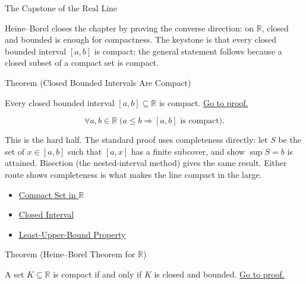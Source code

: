 \label{sec:heine-borel}

\begin{topicbox}{The Capstone of the Real Line}
\begin{exposition}
Heine--Borel closes the chapter by proving the converse direction: on $\mathbb{R}$, closed and bounded is enough for compactness. The keystone is that every closed bounded interval $[a,b]$ is compact; the general statement follows because a closed subset of a compact set is compact.
\end{exposition}
\end{topicbox}
\begin{theorembox}{Theorem (Closed Bounded Intervals Are Compact)}
\begin{theorem}
\label{thm:closed-bounded-interval-compact}
Every closed bounded interval $[a,b]\subseteq\mathbb{R}$ is compact.
\hyperref[prf:closed-bounded-interval-compact]{Go to proof.}
\end{theorem}
\end{theorembox}
\begin{remark*}
\[
\forall a,b\in\mathbb{R}\;\bigl(a\le b \Longrightarrow [a,b]\text{ is compact}\bigr).
\]
\end{remark*}
\begin{remark*}[Interpretation]
This is the hard half. The standard proof uses completeness directly: let $S$ be the set of $x\in[a,b]$ such that $[a,x]$ has a finite subcover, and show $\sup S=b$ is attained. Bisection (the nested-interval method) gives the same result. Either route shows completeness is what makes the line compact in the large.
\end{remark*}
\begin{dependencies}
\begin{itemize}
  \item \hyperref[def:compact-set]{Compact Set in $\mathbb{R}$}
  \item \hyperref[def:closed-interval]{Closed Interval}
  \item \hyperref[thm:lub-property-r]{Least-Upper-Bound Property}
\end{itemize}
\end{dependencies}
\begin{theorembox}{Theorem (Heine--Borel Theorem for $\mathbb{R}$)}
\begin{theorem}
\label{thm:heine-borel}
A set $K\subseteq\mathbb{R}$ is compact if and only if $K$ is closed and bounded.
\hyperref[prf:heine-borel]{Go to proof.}
\end{theorem}
\end{theorembox}

